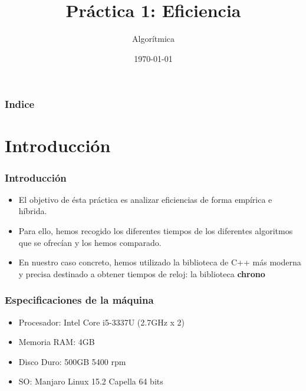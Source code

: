 \documentclass{beamer}
\title[Práctica 1]{Práctica 1: Eficiencia} %
\author{Algorítmica} %
\institute[UGR] %
{
Universidad de Granada \\ %
\medskip

}
\date{\today} %
\begin{document}
\begin{frame}
\titlepage %
\end{frame}

\begin{frame}
\frametitle{Indice} %
\tableofcontents %
\end{frame}


\section{Introducción }
\begin{frame}
	\frametitle{Introducción}
	\begin{itemize}
		\item El objetivo de ésta práctica es analizar eficiencias de forma empírica e híbrida.
		\item Para ello, hemos recogido los diferentes tiempos de los diferentes algoritmos que se ofrecían y los hemos comparado.
		\item En nuestro caso concreto, hemos utilizado la biblioteca de C++ más moderna y precisa destinado a obtener tiempos de reloj: la biblioteca \textbf{chrono}
		\end{itemize}
\end{frame}
\begin{frame}
	\frametitle{Especificaciones de la máquina}
	\begin{itemize}
		
		\item Procesador: Intel Core i5-3337U (2.7GHz x 2)
		\item Memoria RAM: 4GB
	    \item Disco Duro: 500GB 5400 rpm
		\item SO: Manjaro Linux 15.2 Capella 64 bits
	\end{itemize}
	
\end{frame}
\end{document}
